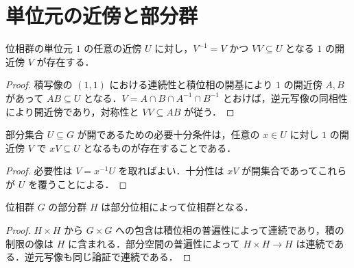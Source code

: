 \section{単位元の近傍と部分群}
\begin{prop}[単位元近傍の縮小]
位相群の単位元 $1$ の任意の近傍 $U$ に対し，$V^{-1}=V$ かつ $VV\subseteq U$ となる $1$ の開近傍 $V$ が存在する．
\end{prop}
\begin{proof}
積写像の $(1,1)$ における連続性と積位相の開基により $1$ の開近傍 $A,B$ があって $AB\subseteq U$ となる．$V=A\cap B\cap A^{-1}\cap B^{-1}$ とおけば，逆元写像の同相性により開近傍であり，対称性と $VV\subseteq AB$ が従う．
\end{proof}
\begin{prop}[単位元近傍による開集合の判定]
部分集合 $U\subseteq G$ が開であるための必要十分条件は，任意の $x\in U$ に対し $1$ の開近傍 $V$ で $xV\subseteq U$ となるものが存在することである．
\end{prop}
\begin{proof}
必要性は $V=x^{-1}U$ を取ればよい．十分性は $xV$ が開集合であってこれらが $U$ を覆うことによる．
\end{proof}
\begin{prop}[部分位相群]
位相群 $G$ の部分群 $H$ は部分位相によって位相群となる．
\end{prop}
\begin{proof}
$H\times H$ から $G\times G$ への包含は積位相の普遍性によって連続であり，積の制限の像は $H$ に含まれる．部分空間の普遍性によって $H\times H\to H$ は連続である．逆元写像も同じ論証で連続である．
\end{proof}

